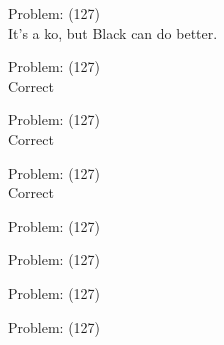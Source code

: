 \documentclass[11pt]{article}
\begin{document}
\begin{minipage}[t]{0.5\textwidth}
  {\centering
  
Problem: (127)\\
It's a ko, but Black can do better.\\
  }
\end{minipage}
\begin{minipage}[t]{0.5\textwidth}
  {\centering
  
Problem: (127)\\
Correct\\
  }
\end{minipage}
\begin{minipage}[t]{0.5\textwidth}
  {\centering
  
Problem: (127)\\
Correct\\
  }
\end{minipage}
\begin{minipage}[t]{0.5\textwidth}
  {\centering
  
Problem: (127)\\
Correct\\
  }
\end{minipage}
\begin{minipage}[t]{0.5\textwidth}
  {\centering
  
Problem: (127)\\
  }
\end{minipage}
\begin{minipage}[t]{0.5\textwidth}
  {\centering
  
Problem: (127)\\
  }
\end{minipage}
\begin{minipage}[t]{0.5\textwidth}
  {\centering
  
Problem: (127)\\
  }
\end{minipage}
\begin{minipage}[t]{0.5\textwidth}
  {\centering
  
Problem: (127)\\
  }
\end{minipage}
\end{document}
